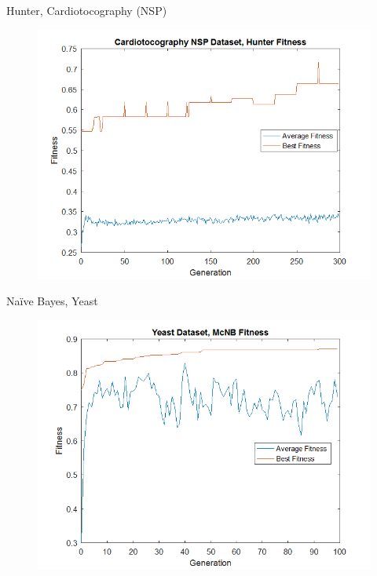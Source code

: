 \documentclass{beamer}
\begin{document}
\begin{frame} {Hunter, Cardiotocography (NSP)}
	\begin{figure}
		\centering
		\includegraphics[width=.95\linewidth]{figures/png/fitnessCardioNSPHunter}
		\label{fig:fitnesscardionsphunter}
	\end{figure}
	
\end{frame}

\begin{frame} {Na\"ive Bayes, Yeast}
	\begin{figure}
		\centering
		\includegraphics[width=.95\linewidth]{figures/png/yeastmcnb}
		\label{fig:fitnessyeastmcnb}
	\end{figure}
	
\end{frame}
\end{document}
